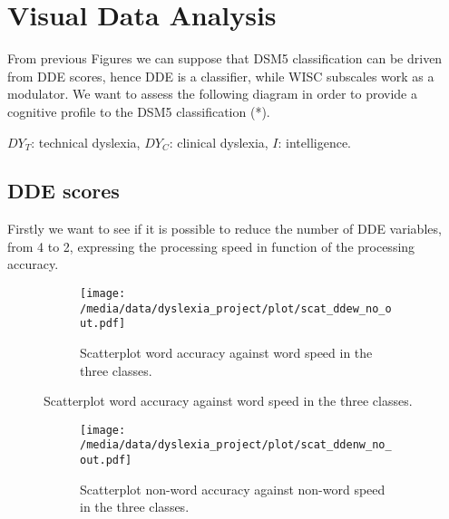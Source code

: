 \documentclass[11pt, a4paper, twoside, openright]{article}
\begin{document}
\clearpage

\section{Visual Data Analysis}
From previous Figures we can suppose that DSM5 classification can be
driven from DDE scores, hence DDE is a classifier, while WISC
subscales work as a modulator. We want to assess the following diagram
in order to provide a cognitive profile to the DSM5 classification (*).

\begin{center}
\end{center}

\small{$DY_T$: technical dyslexia, $DY_C$: clinical dyslexia, $I$: intelligence.}

\subsection{DDE scores}
Firstly we want to see if it is possible to reduce the number of DDE
variables, from 4 to 2, expressing the processing speed in function of
the processing accuracy.
\begin{figure}[h!] 
\centering 
\begin{subfigure}{1\textwidth}
\centering
\texttt{[image: /media/data/dyslexia\_project/plot/scat\_ddew\_no\_out.pdf]}
\caption{Scatterplot word accuracy against word speed in the three classes.}
\label{fig:7a}
\end{subfigure}
\end{figure}
\begin{figure}
\ContinuedFloat
\centering 
\begin{subfigure}{1\textwidth}
\centering
\texttt{[image: /media/data/dyslexia\_project/plot/scat\_ddenw\_no\_out.pdf]}
\caption{Scatterplot non-word accuracy against non-word speed in the three classes.}
\label{fig:7b}
\end{subfigure}
\caption{}
\label{fig:7}
\end{figure}
\end{document}
